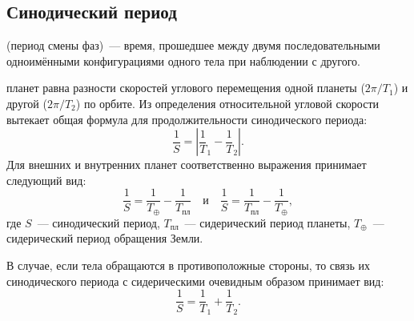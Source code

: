\subsection{Синодический период}

 (период смены фаз)~--- время, прошедшее между двумя последовательными одноимёнными конфигурациями одного тела при наблюдении с другого.

 планет равна 
разности скоростей углового перемещения одной планеты ($2\pi/T_1$) и другой ($2\pi/T_2 $) по орбите. Из определения относительной угловой скорости вытекает общая формула для продолжительности синодического периода: 
\begin{equation}
\frac1S=\left| \frac1T_1-\frac1T_2 \right|.
\end{equation}
Для внешних и внутренних планет соответственно выражения принимает следующий вид: 
\begin{equation} \frac{1}{S} = \frac{1}{T_\oplus} - \frac{1}{T_\text{пл}} \quad \text{и} \quad \frac{1}{S} = \frac{1}{T_\text{пл}} - \frac{1}{T_\oplus},
\end{equation}
где $S$~--- синодический период, $T_\text{пл}$~--- сидерический период планеты, $T_\oplus$~--- сидерический период обращения Земли.

В случае, если тела обращаются в противоположные стороны, то связь 
их синодического периода с сидерическими очевидным образом принимает вид:
\begin{equation}
\frac1S=\frac1T_1+\frac1T_2.
\end{equation}